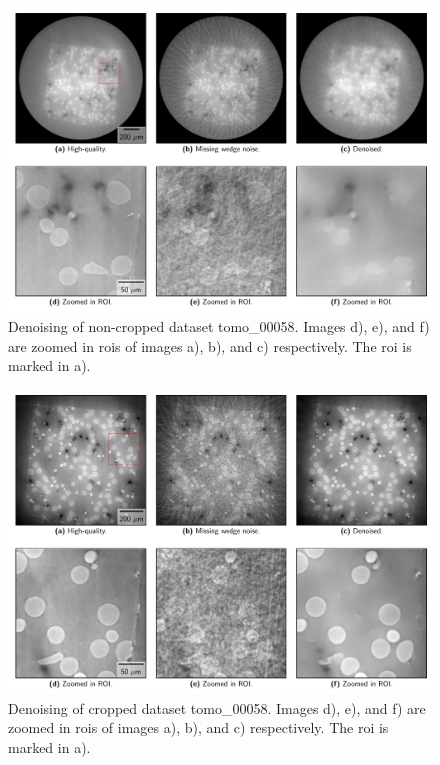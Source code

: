 \begin{figure}[htbp]
  \centering
  \includegraphics[width=.9\textwidth]{figures/uncroppeddenoising.pdf}
  \caption[Non-cropped image denoising]{Denoising of non-cropped dataset tomo\_00058. Images d), e), and f) are zoomed in \gls{roi}s of images a), b), and c) respectively. The \gls{roi} is marked in a). }
  \label{fig:uncroppeddenoising}
\end{figure}

\begin{figure}[htbp]
  \centering
  \includegraphics[width=.9\textwidth]{figures/croppeddenoising.pdf}
  \caption[Cropped image denoising]{Denoising of cropped dataset tomo\_00058. Images d), e), and f) are zoomed in \gls{roi}s of images a), b), and c) respectively. The \gls{roi} is marked in a). }
  \label{fig:croppeddenoising}
\end{figure}

